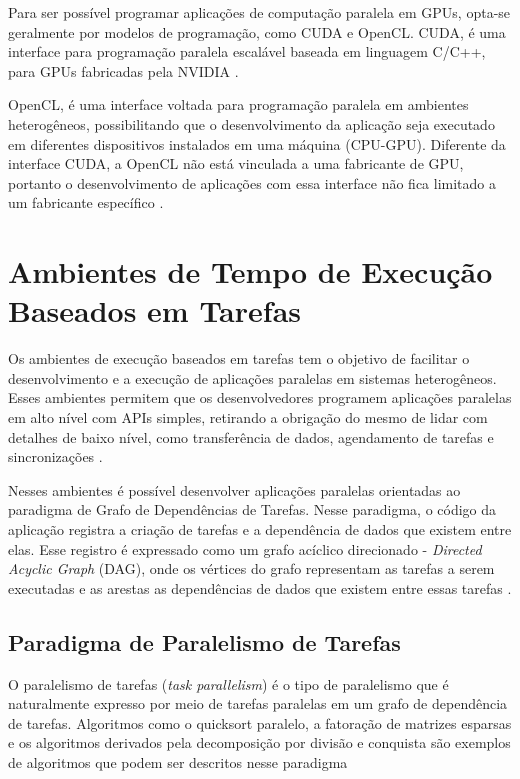 Para ser possível programar aplicações de computação paralela em GPUs, opta-se geralmente por modelos de programação, como CUDA e OpenCL.
CUDA, é uma interface para programação paralela escalável baseada em linguagem C/C++, para GPUs fabricadas pela NVIDIA \cite{hennessy2014organizaccao}.

OpenCL, é uma interface voltada para programação paralela em ambientes heterogêneos, possibilitando que o desenvolvimento da aplicação seja executado em diferentes dispositivos instalados em uma máquina (CPU-GPU).
Diferente da interface CUDA, a OpenCL não está vinculada a uma fabricante de GPU, portanto o desenvolvimento de aplicações com essa interface não fica limitado a um fabricante específico \cite{opencl:2018}.

\section{Ambientes de Tempo de Execução Baseados em Tarefas}
Os ambientes de execução baseados em tarefas tem o objetivo de facilitar o desenvolvimento e a execução de aplicações paralelas em sistemas heterogêneos.
Esses ambientes permitem que os desenvolvedores programem aplicações paralelas em alto nível com APIs simples, retirando a obrigação do mesmo de lidar com detalhes de baixo nível, como transferência de dados, agendamento de tarefas e sincronizações \cite{kumar:tel-01538516}.

Nesses ambientes é possível desenvolver aplicações paralelas orientadas ao paradigma de Grafo de Dependências de Tarefas.
Nesse paradigma, o código da aplicação registra a criação de tarefas e a dependência de dados que existem entre elas.
Esse registro é expressado como um grafo acíclico direcionado - \textit{Directed Acyclic Graph} (DAG), onde os vértices do grafo representam as tarefas a serem executadas e as arestas as dependências de dados que existem entre essas tarefas \cite{kumar:tel-01538516,thoman2018taxonomy}.

\subsection{Paradigma de Paralelismo de Tarefas}

\begin{citacao}
O paralelismo de tarefas (\textit{task parallelism}) é o tipo de paralelismo que é naturalmente expresso por meio de tarefas paralelas em um grafo de dependência de tarefas.
Algoritmos como o quicksort paralelo, a fatoração de matrizes esparsas e os algoritmos derivados pela decomposição por divisão e conquista são exemplos de algoritmos que podem ser descritos nesse paradigma    %
\end{citacao}

